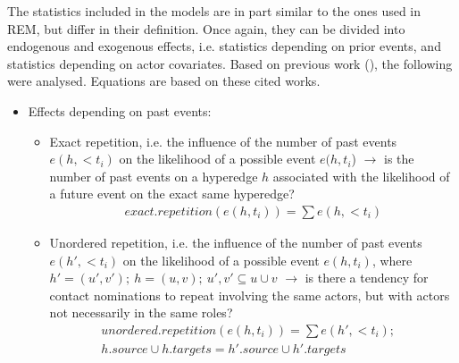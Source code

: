 The statistics included in the models are in part similar to the ones used in REM, but differ in their definition. Once again, they can be divided into endogenous and exogenous effects, i.e. statistics depending on prior events, and statistics depending on actor covariates. Based on previous work (\cite{lerner2019rem,lerner2021relational,hancean2021role,hancean2022occupations}), the following were analysed. Equations are based on these cited works.

\begin{itemize}
	\item Effects depending on past events:
	\begin{itemize}
		\item Exact repetition, i.e. the influence of the number of past events $e(h,<t_i)$ on the likelihood of a possible event $e(h,t_i$) $\rightarrow$ is the number of past events on a hyperedge $h$ associated with the likelihood of a future event on the exact same hyperedge?
		\begin{align*}
			exact.repetition(e(h,t_i)) = \sum e(h,<t_i)
		\end{align*}
		\item Unordered repetition, i.e. the influence of the number of past events $e(h',<t_i)$ on the likelihood of a possible event $e(h,t_i)$, where $h' = (u',v'); \: h = (u,v); \: u',v' \subseteq u \cup v$ $\rightarrow$ is there a tendency for contact nominations to repeat involving the same actors, but with actors not necessarily in the same roles?
		\begin{align*}
			&unordered.repetition(e(h,t_i)) = \sum e(h',<t_i);&&\\
			&h.source \cup h.targets = h'.source \cup h'.targets&&
		\end{align*}
		\begin{figure}
			\begin{mdframed}
				\centering
				\begin{subfigure}[t]{0.45\linewidth}
					\vskip 0pt
\end{subfigure}
\end{mdframed}
\end{figure}
\end{itemize}
\end{itemize}

